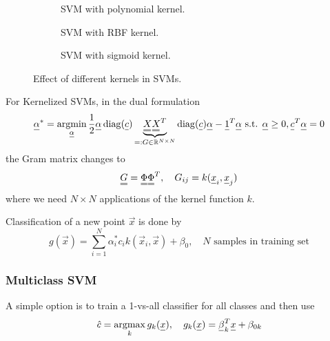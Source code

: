 \begin{figure}

    \centering
    \begin{subfigure}{0.45\textwidth}
      \centering
      
      \caption{SVM with polynomial kernel.}
      \label{fig:poly_kernel}
    \end{subfigure}%



    \begin{subfigure}{0.45\textwidth}
      \centering
      
      \caption{SVM with RBF kernel.}
      \label{fig:rbf_kernel}
    \end{subfigure}



    \begin{subfigure}{0.45\textwidth}
        \centering
        
        \caption{SVM with sigmoid kernel.}
        \label{fig:sigmoid_kernel}
      \end{subfigure}

    \caption{Effect of different kernels in SVMs.}
    \label{fig:kernel_trick}

\end{figure}

For Kernelized SVMs, in the dual formulation
\begin{equation}
    \vec{\alpha}^* = \argmin_{\vec{\alpha}} \frac{1}{2} \vec{\alpha} \operatorname{diag}(\vec{c}) \underbrace{\mat{X} \mat{X}^T}_{=:G \in \mathbb{R}^{N\times N}} \operatorname{diag}(\vec{c}) \vec{\alpha} - \vec{1}^T \vec{\alpha} \text{ s.t. } \vec{\alpha} \geq 0, \vec{c}^T \vec{\alpha} = 0
\end{equation}
the Gram matrix changes to
\begin{equation}
    \mat{G} = \mat{\Phi} \mat{\Phi}^T, \quad G_{ij} = k(\vec{x}_i, \vec{x}_j)
\end{equation}
where we need $N\times N$ applications of the kernel function $k$.

Classification of a new point $\vec{x}$ is done by
\begin{equation}
    g(\vec{x}) = \sum_{i=1}^N \alpha_i^* c_i k(\vec{x}_i, \vec{x}) + \beta_0, \quad N \text{ samples in training set}
\end{equation}

\subsubsection{Multiclass SVM}
A simple option is to train a 1-vs-all classifier for all classes and then use
\begin{equation}
    \hat{c} = \argmax_k g_k(\vec{x}), \quad g_k(\vec{x}) = \vec{\beta}_k^T \vec{x} + \beta_{0k}
\end{equation}


